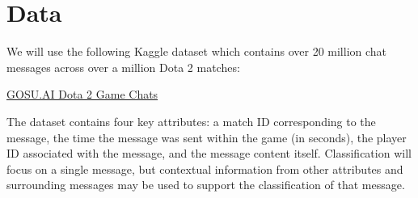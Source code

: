 \documentclass[11pt, letterpaper, notitlepage]{article}
\begin{document}
\newpage

\section[1]{Data}

We will use the following Kaggle dataset which contains over 20 million chat messages across over a million Dota 2 matches:

\begin{center}
    \href{https://www.kaggle.com/datasets/romovpa/gosuai-dota-2-game-chats}{GOSU.AI Dota 2 Game Chats
    }
\end{center}






The dataset contains four key attributes: a match ID corresponding to the message, the time the message was sent within the game (in seconds), the player ID associated with the message, and the message content itself. Classification will focus on a single message, but contextual information from other attributes and surrounding messages may be used to support the classification of that message.
\end{document}
